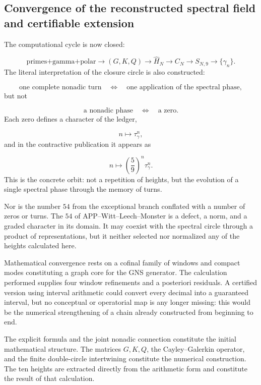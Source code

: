 \subsection{Convergence of the reconstructed spectral field and certifiable extension}
The computational cycle is now closed:\par
\[
\text{primes+gamma+polar}
\longrightarrow
(G,K,Q)
\longrightarrow
\widehat H_N
\longrightarrow
C_N
\longrightarrow
S_{N,9}
\longrightarrow
\{\gamma_n\}.
\]
The literal interpretation of the closure circle is also constructed:\par
\[
\text{one complete nonadic turn}
\quad\Longleftrightarrow\quad
\text{one application of the spectral phase},
\]
but not\par
\[
\text{a nonadic phase}
\quad\Longleftrightarrow\quad
\text{a zero}.
\]
Each zero defines a character of the ledger,\par
\[
n\longmapsto\tau_\gamma^n,
\]
and in the contractive publication it appears as\par
\[
n\longmapsto
\left(\frac59\right)^n\tau_\gamma^n.
\]
This is the concrete orbit: not a repetition of heights, but the evolution of a single spectral phase through the memory of turns.\par
Nor is the number \(54\) from the exceptional branch conflated with a number of zeros or turns. The \(54\) of APP–Witt–Leech–Monster is a defect, a norm, and a graded character in its domain. It may coexist with the spectral circle through a product of representations, but it neither selected nor normalized any of the heights calculated here.\par
Mathematical convergence rests on a cofinal family of windows and compact modes constituting a graph core for the GNS generator. The calculation performed supplies four window refinements and a posteriori residuals. A certified version using interval arithmetic could convert every decimal into a guaranteed interval, but no conceptual or operatorial map is any longer missing: this would be the numerical strengthening of a chain already constructed from beginning to end.\par
The explicit formula and the joint nonadic connection constitute the initial mathematical structure. The matrices \(G,K,Q\), the Cayley–Galerkin operator, and the finite double-circle intertwining constitute the numerical construction. The ten heights are extracted directly from the arithmetic form and constitute the result of that calculation.\par
